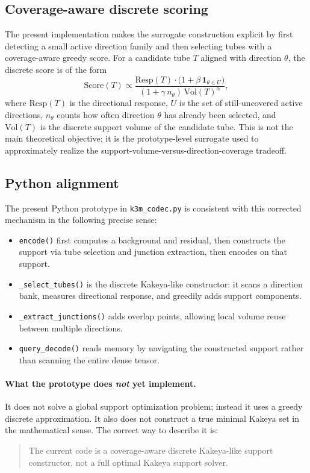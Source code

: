 \documentclass[11pt]{article}
\begin{document}
\subsection{Coverage-aware discrete scoring}
The present implementation makes the surrogate construction explicit by first detecting a small active direction family and then selecting tubes with a coverage-aware greedy score. For a candidate tube $T$ aligned with direction $\theta$, the discrete score is of the form
\begin{equation}
\mathrm{Score}(T)
\propto
\frac{\mathrm{Resp}(T)\cdot\bigl(1+\beta\,\mathbf{1}_{\theta\in U}\bigr)}
{(1+\gamma\,n_\theta)\,\mathrm{Vol}(T)^\alpha},
\end{equation}
where $\mathrm{Resp}(T)$ is the directional response, $U$ is the set of still-uncovered active directions, $n_\theta$ counts how often direction $\theta$ has already been selected, and $\mathrm{Vol}(T)$ is the discrete support volume of the candidate tube. This is not the main theoretical objective; it is the prototype-level surrogate used to approximately realize the support-volume-versus-direction-coverage tradeoff.

\subsection{Python alignment}
The present Python prototype in \texttt{k3m\_codec.py} is consistent with this corrected mechanism in the following precise sense:
\begin{itemize}[leftmargin=1.5em]
\item \texttt{encode()} first computes a background and residual, then constructs the support via tube selection and junction extraction, then encodes on that support.
\item \texttt{\_select\_tubes()} is the discrete Kakeya-like constructor: it scans a direction bank, measures directional response, and greedily adds support components.
\item \texttt{\_extract\_junctions()} adds overlap points, allowing local volume reuse between multiple directions.
\item \texttt{query\_decode()} reads memory by navigating the constructed support rather than scanning the entire dense tensor.
\end{itemize}

\paragraph{What the prototype does \emph{not} yet implement.}
It does not solve a global support optimization problem; instead it uses a greedy discrete approximation. It also does not construct a true minimal Kakeya set in the mathematical sense. The correct way to describe it is:
\begin{quote}
The current code is a coverage-aware discrete Kakeya-like support constructor, not a full optimal Kakeya support solver.
\end{quote}
\end{document}
